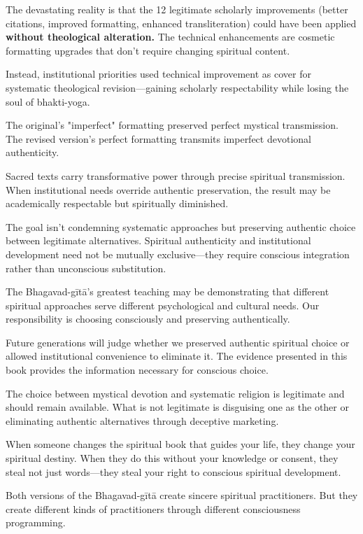 \documentclass[12pt,twoside]{book}
\begin{document}
The devastating reality is that the 12 legitimate scholarly improvements (better citations, improved formatting, enhanced transliteration) could have been applied \textbf{\textbf{without theological alteration.}} The technical enhancements are cosmetic formatting upgrades that don't require changing spiritual content.

Instead, institutional priorities used technical improvement as cover for systematic theological revision—gaining scholarly respectability while losing the soul of bhakti-yoga.

The original's "imperfect" formatting preserved perfect mystical transmission. The revised version's perfect formatting transmits imperfect devotional authenticity.

Sacred texts carry transformative power through precise spiritual transmission. When institutional needs override authentic preservation, the result may be academically respectable but spiritually diminished.

The goal isn't condemning systematic approaches but preserving authentic choice between legitimate alternatives. Spiritual authenticity and institutional development need not be mutually exclusive—they require conscious integration rather than unconscious substitution.

The Bhagavad-gītā's greatest teaching may be demonstrating that different spiritual approaches serve different psychological and cultural needs. Our responsibility is choosing consciously and preserving authentically.

Future generations will judge whether we preserved authentic spiritual choice or allowed institutional convenience to eliminate it. The evidence presented in this book provides the information necessary for conscious choice.

The choice between mystical devotion and systematic religion is legitimate and should remain available. What is not legitimate is disguising one as the other or eliminating authentic alternatives through deceptive marketing.

When someone changes the spiritual book that guides your life, they change your spiritual destiny. When they do this without your knowledge or consent, they steal not just words—they steal your right to conscious spiritual development.

Both versions of the Bhagavad-gītā create sincere spiritual practitioners. But they create different kinds of practitioners through different consciousness programming.
\end{document}
